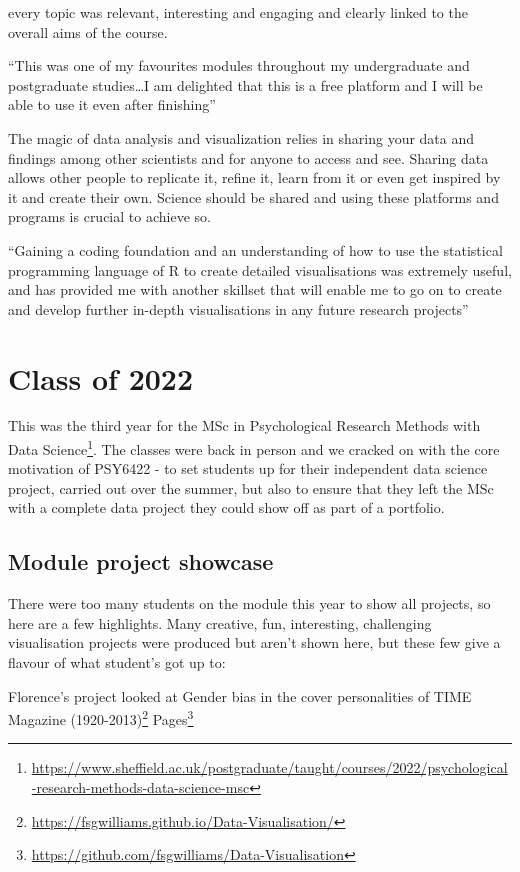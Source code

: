 \documentclass[
  12pt,
  a5paper,
]{book}
\DeclareRobustCommand{\href}[2]{#2\footnote{\url{#1}}}
\begin{document}
every topic was relevant, interesting and engaging and clearly linked to the overall aims of the course.

``This was one of my favourites modules throughout my undergraduate and postgraduate studies\ldots I am delighted that this is a free platform and I will be able to use it even after finishing''

The magic of data analysis and visualization relies in sharing your data and findings among other scientists and for anyone to access and see. Sharing data allows other people to replicate it, refine it, learn from it or even get inspired by it and create their own. Science should be shared and using these platforms and programs is crucial to achieve so.

``Gaining a coding foundation and an understanding of how to use the statistical programming language of R to create detailed visualisations was extremely useful, and has provided me with another skillset that will enable me to go on to create and develop further in-depth visualisations in any future research projects''

\hypertarget{class-of-2022}{%
\chapter{Class of 2022}\label{class-of-2022}}

This was the third year for the \href{https://www.sheffield.ac.uk/postgraduate/taught/courses/2022/psychological-research-methods-data-science-msc}{MSc in Psychological Research Methods with Data Science}. The classes were back in person and we cracked on with the core motivation of PSY6422 - to set students up for their independent data science project, carried out over the summer, but also to ensure that they left the MSc with a complete data project they could show off as part of a portfolio.

\hypertarget{module-project-showcase}{%
\section{Module project showcase}\label{module-project-showcase}}

There were too many students on the module this year to show all projects, so here are a few highlights. Many creative, fun, interesting, challenging visualisation projects were produced but aren't shown here, but these few give a flavour of what student's got up to:

Florence's project looked at \href{https://fsgwilliams.github.io/Data-Visualisation/}{Gender bias in the cover personalities of TIME Magazine (1920-2013)}
\href{https://github.com/fsgwilliams/Data-Visualisation}{Pages}
\end{document}
